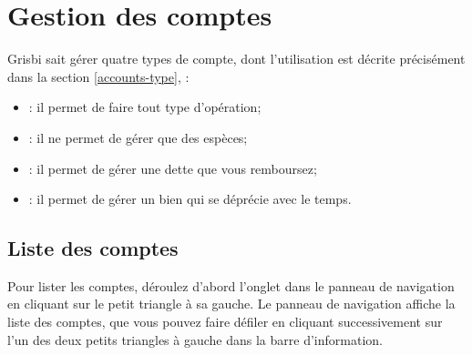 

\chapter{Gestion des comptes\label{accounts}}

Grisbi sait gérer quatre types de compte, dont l'utilisation est décrite précisément dans la section \vref{accounts-type}, :
\begin{itemize}
	\item {}: il permet de faire tout type d'opération;
	\item {}: il ne permet de gérer que des espèces;
	\item {}: il permet de gérer une dette que vous remboursez; 
	\item {}: il permet de gérer un bien qui se déprécie avec le temps. 
\end{itemize}


\section{Liste des comptes\label{accounts-list}}


Pour lister les comptes, déroulez d'abord l'onglet  dans le panneau de navigation en cliquant sur le petit triangle à sa gauche. Le panneau de navigation affiche la liste des comptes, que vous pouvez faire défiler en cliquant successivement sur l'un des deux petits triangles à gauche dans la barre d'information.

